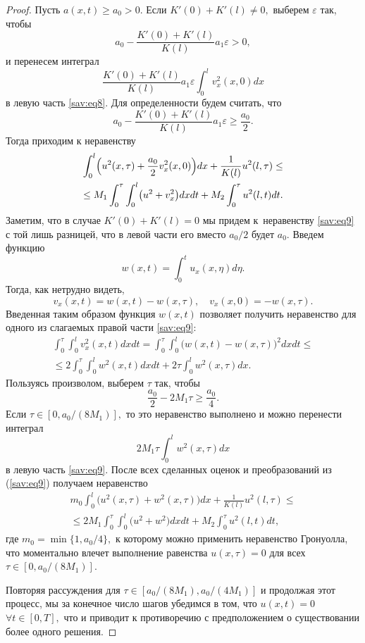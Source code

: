\begin{proof}
Пусть $a(x,t)\geq a_0>0.$
Если $K'(0)+K'(l)\ne 0,$ выберем $\varepsilon$ так, чтобы
 $$a_0-\frac{K'(0)+K'(l)}{K(l)}a_1\varepsilon >0,$$ и перенесем интеграл
$$
\frac{K'(0)+K'(l)}{K(l)}a_1\varepsilon  \int _0^lv_x^2(x, 0)dx
$$ 
в левую часть \eqref{sav:eq8}.  
Для определенности будем считать, что
$$a_0-\frac{K'(0)+K'(l)}{K(l)}a_1\varepsilon \geq \frac{a_0}{2}.$$
Тогда приходим к неравенству
\begin{multline}
\int _0^l
\Bigl( u^2(x,\tau)+\frac{a_0}{2}v^2_x(x, 0)\Bigr)dx+
\frac{1}{K(l)}u^2(l,\tau)\leq
\\
\label{sav:eq9}
\leq M_1 \int _0^{\tau} \int _0^l \bigl(u^2+v_x^2 \bigr) dxdt  +M_2 \int _0^{\tau}u^2(l, t)dt.
\end{multline}
Заметим, что в случае $K'(0)+K'(l)=0$ мы придем к~неравенству \eqref{sav:eq9} с той лишь разницей, что в левой части его вместо ${a_0}/{2}$ будет $a_0.$
Введем функцию 
$$w(x,t)= \int _0^tu_x(x,\eta)d\eta.$$
Тогда, как нетрудно видеть,
$$v_x(x,t)=w(x,t)-w(x,\tau), \quad  v_x(x, 0)=-w(x,\tau).$$
Введенная таким образом функция $w(x,t)$ позволяет получить неравенство для одного
из слагаемых правой части \eqref{sav:eq9}:
\begin{multline}
\int _0^{\tau} \int _0^lv_x^2(x,t)dxdt=
 \int _0^{\tau} \int _0^l \bigl(w(x,t)-w(x,\tau)\bigr)^2dxdt\leq 
 \\
\leq 2 \int _0^{\tau} \int _0^lw^2(x,t)dxdt+
 2\tau  \int _0^lw^2(x,\tau)dx.
\end{multline}
Пользуясь произволом, выберем $\tau$ так, чтобы
 $$\frac{a_0}{2}-2M_1\tau \geq \frac{a_0}{4}.$$ 
 Если  $\tau \in [0, {a_0}/({8M_1})],$ то это неравенство выполнено и можно перенести интеграл 
 $$2M_1\tau  \int _0^lw^2(x,\tau)dx$$ в левую часть \eqref{sav:eq9}.
После всех сделанных оценок и преобразований из (\ref{sav:eq9}) получаем неравенство
\begin{multline}
m_0 \int _0^l \bigl( u^2(x,\tau)+w^2(x,\tau)\bigr) dx+
\frac{1}{K(l)}u^2(l,\tau)\leq
\\
\label{sav:eq91}
\leq 2M_1 \int _0^{\tau} \int _0^l \bigl(u^2+w^2 \bigr) dxdt+ M_2 \int _0^{\tau}u^2(l,t)dt,
\end{multline}
где $m_0=\min\{1, a_0/4\},$
к которому можно применить неравенство Гронуолла, что моментально влечет выполнение равенства  $u(x, \tau)=0$
для всех $\tau \in [0, {a_0}/({8M_1})].$

Повторяя рассуждения для $\tau \in [{a_0}/({8M_1}), {a_0}/({4M_1})]$ и продолжая этот процесс,
мы за конечное число шагов убедимся в том, что $u(x, t)=0$  $ \forall t\in [0, T],$
что и приводит к противоречию с предположением о существовании более одного решения.


\end{proof}
